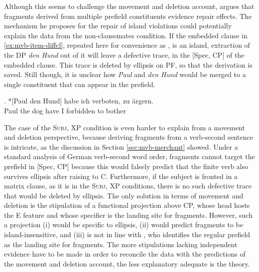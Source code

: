 Although this seems to challenge the movement and deletion account, \citet[710--711]{merchant2004} argues that fragments derived from multiple prefield constituents evidence repair effects. The mechanism he proposes for the repair of island violations could potentially explain the data from the non-clausemates condition. If the embedded clause in \ref{ex:mvb-item-diffcl}, repeated here for convenience as \Next, is an island, extraction of the DP \textit{den Hund} out of it will leave a defective trace, in the [Spec, CP] of the embedded clause. This trace is deleted by ellipsis on PF, so that the derivation is saved. Still though, it is unclear how \textit{Paul} and \textit{den Hund} would be merged to a single constituent that can appear in the prefield.

\exg.  *[Paul den Hund] habe  ich verboten, zu ärgern. \\
     Paul   the  dog     have  I     forbidden to bother\\

The case of the \textsc{Subj, XP} condition is even harder to explain from a movement and deletion perspective, because deriving fragments from a verb-second sentence is intricate, as the discussion in Section \ref{sec:mvb-merchant} showed. Under a standard analysis of German verb-second word order, fragments cannot target the prefield in [Spec, CP] because this would falsely predict that the finite verb also survives ellipsis after raising to C. Furthermore, if the subject is fronted in a matrix clause, as it is in the \textsc{Subj, XP} conditions, there is no such defective trace that would be deleted by ellipsis. The only solution in terms of movement and deletion is the stipulation of a functional projection above CP, whose head hosts the E feature and whose specifier is the landing site for fragments. However, such a projection (i) would be specific to ellipsis, (ii) would predict fragments to be island-insensitive, and (iii) is not in line with \citet{merchant2004}, who identifies the regular prefield as the landing site for fragments. The more stipulations lacking independent evidence have to be made in order to reconcile the data with the predictions of the movement and deletion account, the less explanatory adequate is the theory.

